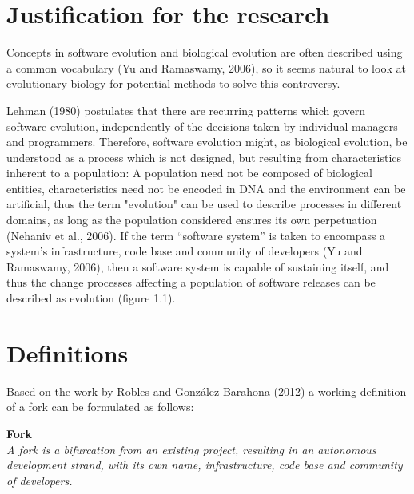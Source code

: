 
\section{Justification for the research}

Concepts in software evolution and biological evolution are often described using a common vocabulary (Yu and Ramaswamy, 2006), so it seems natural to look at evolutionary biology for potential methods to solve this controversy.

Lehman (1980) postulates that there are recurring patterns which govern software evolution, independently of the decisions taken by individual managers and programmers. Therefore, software evolution might, as biological evolution, be understood as a process which is not designed, but resulting from characteristics inherent to a population: A population need not be composed of biological entities, characteristics need not be encoded in DNA and the environment can be artificial, thus the term "evolution" can be used to describe processes in different domains, as long as the population considered ensures its own perpetuation (Nehaniv et al., 2006). If the term “software system” is taken to encompass a system's infrastructure, code base and community of developers (Yu and Ramaswamy, 2006), then a software system is capable of sustaining itself, and thus the change processes affecting a population of software releases can be described as evolution (figure 1.1).


\section{Definitions}

Based on the work by Robles and González-Barahona (2012) a working definition of a fork can be formulated as follows:

\begin{description}
\item{\textbf{Fork}} \hfill \\ \textit{A fork is a bifurcation from an existing project, resulting in an autonomous development strand, with its own name, infrastructure, code base and community of developers.}
\end{description}

